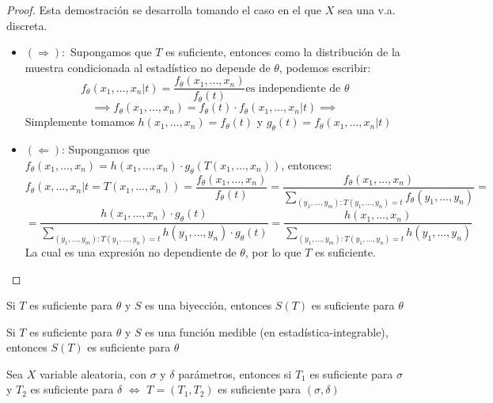   
\begin{proof}
	Esta demostración se desarrolla tomando el caso en el que $X$ sea una v.a. discreta. 
	\begin{itemize}
		\item $(\Rightarrow):$ Supongamos que $T$ es suficiente, entonces como la distribución de la muestra condicionada al estadístico no depende de $\theta$, podemos escribir:
		      $$ f_{\theta}(x_1, \ldots, x_n | t) = \frac{f_{\theta}(x_1, \ldots, x_n)}{f_{\theta}(t)} \text{es independiente de } \theta$$
		      $$\implies f_{\theta}(x_1, \ldots, x_n) = f_{\theta}(t) \cdot f_{\theta}(x_1, \ldots, x_n | t) \implies$$
		      Simplemente tomamos $h(x_1, \ldots, x_n) = f_{\theta}(t)$ y $g_{\theta}(t) = f_{\theta}(x_1, \ldots, x_n | t)$
		\item $(\Leftarrow)$: Supongamos que $f_{\theta}(x_1, \ldots, x_n) = h(x_1, \ldots, x_n) \cdot g_{\theta}(T(x_1, \ldots, x_n))$, entonces:\\
		      $$ f_{\theta}(x, \ldots, x_n | t = T(x_1, \ldots, x_n)) = \frac{f_{\theta}(x_1, \ldots, x_n)}{f_{\theta}(t)} = \frac{f_{\theta}(x_1, \ldots, x_n)}{\sum_{(y_1, \ldots, y_m) : T(y_1, \ldots, y_n) = t} f_{\theta}(y_1, \ldots, y_n)} = $$ $$ = \frac{h(x_1, \ldots, x_n) \cdot g_{\theta}(t)}{\sum_{(y_1, \ldots, y_m) : T(y_1, \ldots, y_n) = t} h(y_1, \ldots, y_n) \cdot g_{\theta}(t)} = \frac{h(x_1, \ldots, x_n)}{\sum_{(y_1, \ldots, y_m) : T(y_1, \ldots, y_n) = t} h(y_1, \ldots, y_n)}$$ La cual es una expresión no dependiente de $\theta$, por lo que $T$ es suficiente.
	\end{itemize}
\end{proof}

\begin{proposición}
	Si $T$ es suficiente para $\theta$ y $S$ es una biyección, entonces $S(T)$ es suficiente para $\theta$
\end{proposición}

\begin{proposición}
	Si $T$ es suficiente para $\theta$ y $S$ es una función medible (en estadística-integrable), entonces $S(T)$ es suficiente para $\theta$
\end{proposición}

\begin{proposición}
	Sea $X$ variable aleatoria, con $\sigma$ y $\delta$ parámetros, entonces si $T_1$ es suficiente para $\sigma$ y $T_2$ es suficiente para $\delta$ $\iff$ $T = (T_1, T_2)$ es suficiente para $(\sigma, \delta)$
\end{proposición}

